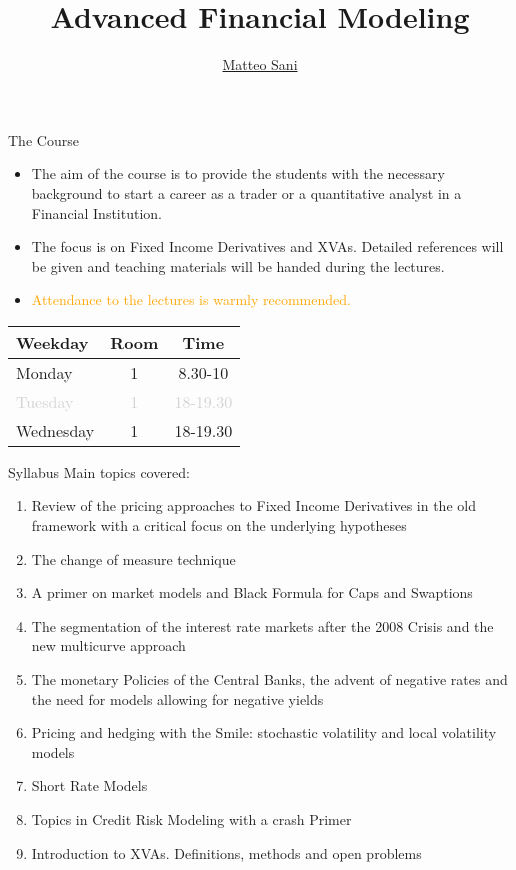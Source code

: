\documentclass{beamer}
\title{Advanced Financial Modeling}
\author{\href{mailto:matteo.sani@unisi.it}{Matteo Sani}}
\begin{document}
\begin{frame}[plain]
	\maketitle
\end{frame}

\begin{frame}{The Course}
	\begin{itemize}
	\item The aim of the course is to provide the students with the necessary background to start a career as a trader or a quantitative analyst in a Financial Institution.
	\item The focus is on Fixed Income Derivatives and XVAs. Detailed references will be given and teaching materials will be handed during the lectures.
	\item \textcolor{orange}{Attendance to the lectures is warmly recommended.}
	\end{itemize}
	\begin{table}[bt]
		\begin{tabular}{|l|c|c|} \hline
			\textbf{Weekday} & \textbf{Room} & \textbf{Time} \\ \hline
			Monday & 1 & 8.30-10 \\ \hline
			\textcolor{lightgray}{Tuesday} & \textcolor{lightgray}{1} & \textcolor{lightgray}{18-19.30} \\ \hline
			Wednesday & 1 & 18-19.30 \\ \hline
		\end{tabular}
	\end{table}
\end{frame}

\begin{frame}{Syllabus}
	Main topics covered:
	\begin{enumerate}	
	\item \textcolor{maincolor}{Review of the pricing approaches to Fixed Income Derivatives in the old framework with a critical focus on the underlying hypotheses}
	\item \textcolor{maincolor}{The change of measure technique}
	\item \textcolor{maincolor}{A primer on market models and Black Formula for Caps and Swaptions}
	\item The segmentation of the interest rate markets after the 2008 Crisis and the new multicurve approach
	\item The monetary Policies of the Central Banks, \textcolor{maincolor}{the advent of negative rates and the need for models allowing for negative yields}
	\item Pricing and hedging with the Smile: stochastic volatility and local volatility models
	\item Short Rate Models 
	\item Topics in Credit Risk Modeling with a crash Primer
	\item Introduction to XVAs. Definitions, methods and open problems
	\end{enumerate}
\end{frame}
\end{document}
